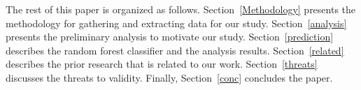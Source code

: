 
 
 
 
The rest of this paper is organized as follows. Section~\ref{Methodology} presents the methodology for gathering and extracting data for our study. Section~\ref{analysis} presents the preliminary analysis to motivate our study. Section~\ref{prediction} describes the random forest classifier and the analysis results. Section~\ref{related} describes the prior research that is related to our work. Section~\ref{threats} discusses the threats to validity. Finally, Section~\ref{conc} concludes the paper.
 
 
